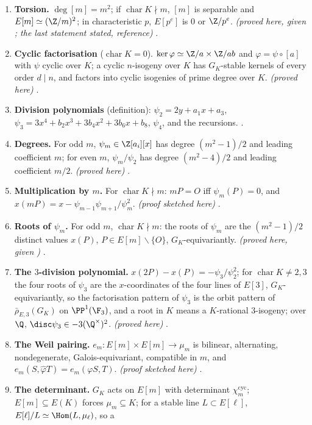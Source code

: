 \begin{enumerate}[label=\textbf{\thechapter.\arabic*}]
\item \textbf{Torsion.} $\deg[m]=m^2$; if $\operatorname{char}K\nmid m$, $[m]$ is separable and $E[m]\simeq(\Z/m)^2$; in characteristic $p$, $E[p^e]$ is $0$ or $\Z/p^e$. \emph{(proved here, given
; the last statement stated, reference)} .
\item \textbf{Cyclic factorisation} ($\operatorname{char}K=0$). $\ker\varphi\simeq\Z/a\times\Z/ab$ and $\varphi=\psi\circ[a]$ with $\psi$ cyclic over $K$; a cyclic $n$-isogeny over $K$ has $G_K$-stable kernels of every
order $d\mid n$, and factors into cyclic isogenies of prime degree over $K$. \emph{(proved here)} .
\item \textbf{Division polynomials} (definition): $\psi_2=2y+a_1x+a_3$, $\psi_3=3x^4+b_2x^3+3b_4x^2+3b_6x+b_8$, $\psi_4$, and the recursions. .
\item \textbf{Degrees.} For odd $m$, $\psi_m\in\Z[a_i][x]$ has degree $(m^2-1)/2$ and leading coefficient $m$; for even $m$, $\psi_m/\psi_2$ has degree $(m^2-4)/2$ and leading coefficient $m/2$.
\emph{(proved here)} .
\item \textbf{Multiplication by $m$.} For $\operatorname{char}K\nmid m$: $mP=O$ iff $\psi_m(P)=0$, and $x(mP)=x-\psi_{m-1}\psi_{m+1}/\psi_m^2$. \emph{(proof sketched here)} .
\item \textbf{Roots of $\psi_m$.} For odd $m$, $\operatorname{char}K\nmid m$: the roots of $\psi_m$ are the $(m^2-1)/2$ distinct values $x(P)$, $P\in E[m]\smallsetminus\{O\}$, $G_K$-equivariantly. \emph{(proved here,
given )} .
\item \textbf{The $3$-division polynomial.} $x(2P)-x(P)=-\psi_3/\psi_2^2$; for $\operatorname{char}K\ne2,3$ the four roots of $\psi_3$ are the $x$-coordinates of the four lines of $E[3]$, $G_K$-equivariantly, so the
factorisation pattern of $\psi_3$ is the orbit pattern of $\bar\rho_{E,3}(G_K)$ on $\PP^1(\F_3)$, and a root in $K$ means a $K$-rational $3$-isogeny; over $\Q$, $\disc\psi_3\in-3(\Q^\times)^2$.
\emph{(proved here)} .
\item \textbf{The Weil pairing.} $e_m\colon E[m]\times E[m]\to\mu_m$ is bilinear, alternating, nondegenerate, Galois-equivariant, compatible in $m$, and $e_m(S,\hat\varphi T)=e_m(\varphi S,T)$. \emph{(proof
sketched here)} .
\item \textbf{The determinant.} $G_K$ acts on $E[m]$ with determinant $\chi_m^{\mathrm{cyc}}$; $E[m]\subseteq E(K)$ forces $\mu_m\subseteq K$; for a stable line $L\subset E[\ell]$, $E[\ell]/L\simeq\Hom(L,\mu_\ell)$, so a

\end{enumerate}
